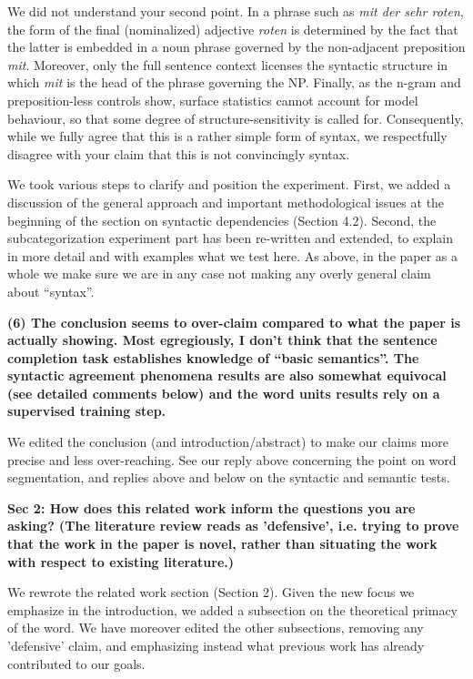 \documentclass{article}
\begin{document}
We did not understand your second point. In a phrase such as \textit{mit der sehr roten}, the form of the final (nominalized) adjective \textit{roten} is determined by the fact that the latter is embedded in a noun phrase governed by the non-adjacent preposition \textit{mit}. Moreover, only the full sentence context licenses the syntactic structure in which \textit{mit} is the head of the phrase governing the NP. Finally, as the n-gram and preposition-less controls show, surface statistics cannot account for model behaviour, so that some degree of structure-sensitivity is called for. Consequently, while we fully agree that this is a rather simple form of syntax, we respectfully disagree with your claim that this is not convincingly syntax.

We took various steps to clarify and position the experiment. First, we added a discussion of the general approach and important methodological issues at the beginning of the section on syntactic dependencies (Section 4.2). Second, the subcategorization experiment part has been re-written and extended, to explain in more detail and with examples what we test here. As above, in the paper as a whole we make sure we are in any case not making any overly general claim about ``syntax''.
\newline

\textbf{(6) The conclusion seems to over-claim compared to what the paper is actually showing. Most egregiously, I don't think that the sentence completion task establishes knowledge of ``basic semantics''. The syntactic agreement phenomena results are also somewhat equivocal (see detailed comments below) and the word units results rely on a supervised training step.}

We edited the conclusion (and introduction/abstract) to make our claims more precise and less over-reaching. See our reply above concerning the point on word segmentation, and replies above and below on the syntactic and semantic tests.
\newline

\textbf{Sec 2: How does this related work inform the questions you are asking? (The literature review reads as 'defensive', i.e. trying to prove that the work in the paper is novel, rather than situating the work with respect to existing literature.)}

We rewrote the related work section (Section 2). Given the new focus we emphasize in the introduction, we added a subsection on the theoretical primacy of the word. We have moreover edited the other subsections, removing any 'defensive' claim, and emphasizing instead what previous work has already contributed to our goals.
\newline
\end{document}
